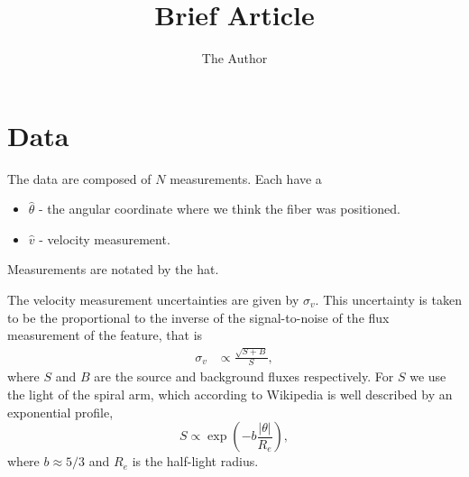 \documentclass[11pt, oneside]{article}   	%
\title{Brief Article}
\author{The Author}
\begin{document}
\maketitle

\section{Data}
The data are composed of $N$ measurements.  Each have a
\begin{itemize}
\item $\hat{\theta}$ - the angular coordinate where we think the fiber was positioned.
\item $\hat{v}$ - velocity measurement.
\end{itemize}
Measurements are notated by the hat.

The velocity measurement uncertainties are given by $\sigma_v$.  
This uncertainty is taken to be the proportional to the inverse of the signal-to-noise of the flux measurement of the feature, that is
\begin{align*}
\sigma_v & \propto \frac{\sqrt{S + B}}{S},
\end{align*}
where $S$ and $B$ are the source and background fluxes respectively.
For $S$ we use the light of the spiral arm, which according to Wikipedia is well described by an exponential profile,
\begin{equation}
S \propto \exp{\left(-b \frac{|\theta|}{R_e}\right)},
\end{equation}
where $b \approx 5/3$ and $R_e$ is the half-light radius.
\end{document}
